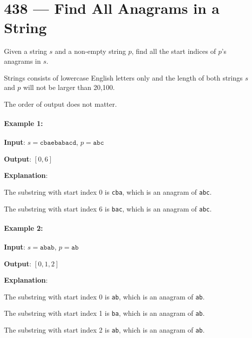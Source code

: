 \section{438 --- Find All Anagrams in a String}
Given a string $ s $ and a non-empty string $ p $, find all the start indices of $ p $'s anagrams in $ s $.

Strings consists of lowercase English letters only and the length of both strings $s$ and $p$ will not be larger than 20,100.

The order of output does not matter.

\paragraph{Example 1:}

\begin{flushleft}
\textbf{Input}: $s = \texttt{cbaebabacd}$,  $p=\texttt{abc}$

\textbf{Output}: $[0, 6]$

\textbf{Explanation}:

The substring with start index 0 is \texttt{cba}, which is an anagram of \texttt{abc}.

The substring with start index 6 is \texttt{bac}, which is an anagram of \texttt{abc}.
\end{flushleft}


\paragraph{Example 2:}

\begin{flushleft}
\textbf{Input}: $s=\texttt{abab}$, $p= \texttt{ab}$

\textbf{Output}: $[0, 1, 2]$

\textbf{Explanation}:

The substring with start index 0 is \texttt{ab}, which is an anagram of \texttt{ab}.

The substring with start index 1 is \texttt{ba}, which is an anagram of \texttt{ab}.

The substring with start index 2 is \texttt{ab}, which is an anagram of \texttt{ab}.
\end{flushleft}


